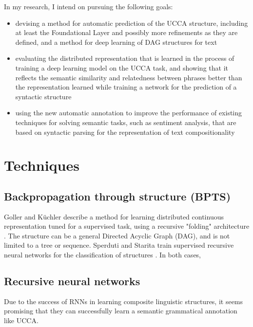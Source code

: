 \documentclass[11pt]{article}
\begin{document}
In my research, I intend on pursuing the following goals:

\begin{itemize}
  \item devising a method for automatic prediction of the UCCA structure, including at least the Foundational Layer and possibly more refinements as they are defined, and a method for deep learning of DAG structures for text
  \item evaluating the distributed representation that is learned in the process of training a deep learning model on the UCCA task, and showing that it reflects the semantic similarity and relatedness between phrases better than the representation learned while training a network for the prediction of a syntactic structure
  \item using the new automatic annotation to improve the performance of existing techniques for solving semantic tasks, such as sentiment analysis, that are based on syntactic parsing for the representation of text compositionality
\end{itemize}



\section{Techniques}

\subsection{Backpropagation through structure (BPTS)}

Goller and K{\"u}chler describe a method for learning distributed continuous representation tuned for a supervised task, using a recursive "folding" architecture \cite{goller1996learning}. The structure can be a general Directed Acyclic Graph (DAG), and is not limited to a tree or sequence. Sperduti and Starita train supervised recursive neural networks for the classification of structures \cite{sperduti1997supervised}. In both cases, 


\subsection{Recursive neural networks}

Due to the success of RNNs in learning composite linguistic structures, it seems promising that they can successfully learn a semantic grammatical annotation like UCCA.
\end{document}
